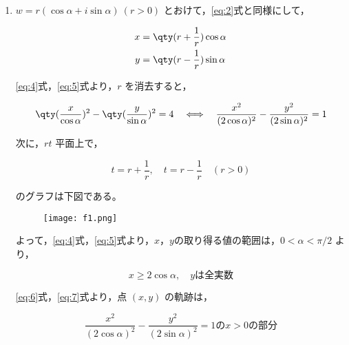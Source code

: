 \documentclass[a4paper]{ltjsarticle}
\begin{document}
\begin{enumerate}[label=(\arabic*)]
    \item $w=r(\cos\alpha+i\sin\alpha)\ (r>0)$ とおけて，\eqref{eq:2}式と同様にして，

          \begin{align}
              x & =\qty(r+\frac{1}{r})\cos\alpha\label{eq:4} \\
              y & =\qty(r-\frac{1}{r})\sin\alpha\label{eq:5}
          \end{align}

          \eqref{eq:4}式，\eqref{eq:5}式より，$r$ を消去すると，

          \begin{equation}
              \qty(\frac{x}{\cos\alpha})^2-\qty(\frac{y}{\sin\alpha})^2=4\quad\Longleftrightarrow\quad \frac{x^2}{(2\cos\alpha)^2}-\frac{y^2}{(2\sin\alpha)^2}=1\label{eq:6}
          \end{equation}

          次に，$rt$ 平面上で，

          \begin{equation*}
              t=r+\frac{1}{r},\quad t=r-\frac{1}{r}\quad (r>0)
          \end{equation*}

          のグラフは下図である。

          \begin{figure}[!ht]
              \centering
              \texttt{[image: f1.png]}
          \end{figure}

          よって，\eqref{eq:4}式，\eqref{eq:5}式より，$x$，$y$の取り得る値の範囲は，$0<\alpha<\pi/2$ より，

          \begin{equation}
              x\geq 2\cos\alpha,\quad y\text{は全実数}\label{eq:7}
          \end{equation}

          \eqref{eq:6}式，\eqref{eq:7}式より，点 $(x,y)$ の軌跡は，

          \begin{equation*}
              \frac{x^2}{(2\cos\alpha)^2}-\frac{y^2}{(2\sin\alpha)^2}=1\text{の}x>0\text{の部分}
          \end{equation*}
\end{enumerate}
\end{document}
